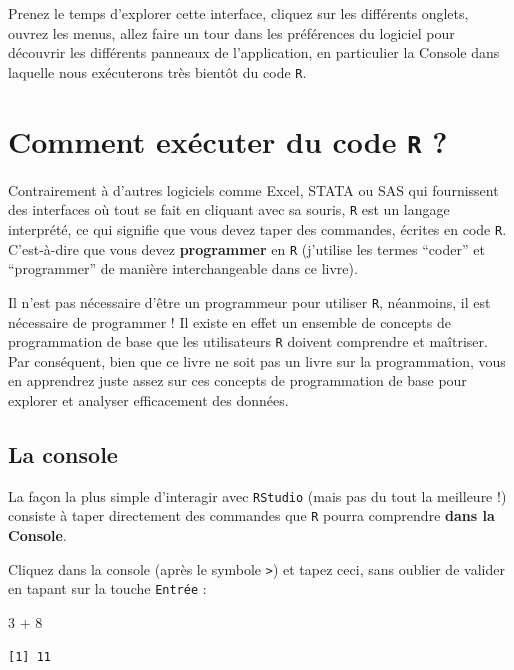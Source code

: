 \documentclass[
  a4paper,
  DIV=11,
  numbers=noendperiod,
  oneside]{scrreprt}
\newenvironment{Shaded}{}{}
\newcommand{\DecValTok}[1]{\textcolor[rgb]{0.00,0.36,0.77}{#1}}
\newcommand{\SpecialCharTok}[1]{\textcolor[rgb]{0.00,0.36,0.77}{#1}}
\begin{document}
Prenez le temps d'explorer cette interface, cliquez sur les différents
onglets, ouvrez les menus, allez faire un tour dans les préférences du
logiciel pour découvrir les différents panneaux de l'application, en
particulier la Console dans laquelle nous exécuterons très bientôt du
code \texttt{R}.

\section{\texorpdfstring{Comment exécuter du code \texttt{R}
?}{Comment exécuter du code R ?}}\label{sec-code}

Contrairement à d'autres logiciels comme Excel, STATA ou SAS qui
fournissent des interfaces où tout se fait en cliquant avec sa souris,
\texttt{R} est un langage interprété, ce qui signifie que vous devez
taper des commandes, écrites en code \texttt{R}. C'est-à-dire que vous
devez \textbf{programmer} en \texttt{R} (j'utilise les termes ``coder''
et ``programmer'' de manière interchangeable dans ce livre).

Il n'est pas nécessaire d'être un programmeur pour utiliser \texttt{R},
néanmoins, il est nécessaire de programmer ! Il existe en effet un
ensemble de concepts de programmation de base que les utilisateurs
\texttt{R} doivent comprendre et maîtriser. Par conséquent, bien que ce
livre ne soit pas un livre sur la programmation, vous en apprendrez
juste assez sur ces concepts de programmation de base pour explorer et
analyser efficacement des données.

\subsection{La console}\label{la-console}

La façon la plus simple d'interagir avec \texttt{RStudio} (mais pas du
tout la meilleure !) consiste à taper directement des commandes que
\texttt{R} pourra comprendre \textbf{dans la Console}.

Cliquez dans la console (après le symbole \texttt{\textgreater{}}) et
tapez ceci, sans oublier de valider en tapant sur la touche
\texttt{Entrée} :

\begin{Shaded}
\begin{Highlighting}[]
\DecValTok{3} \SpecialCharTok{+} \DecValTok{8}
\end{Highlighting}
\end{Shaded}

\begin{verbatim}
[1] 11
\end{verbatim}
\end{document}
